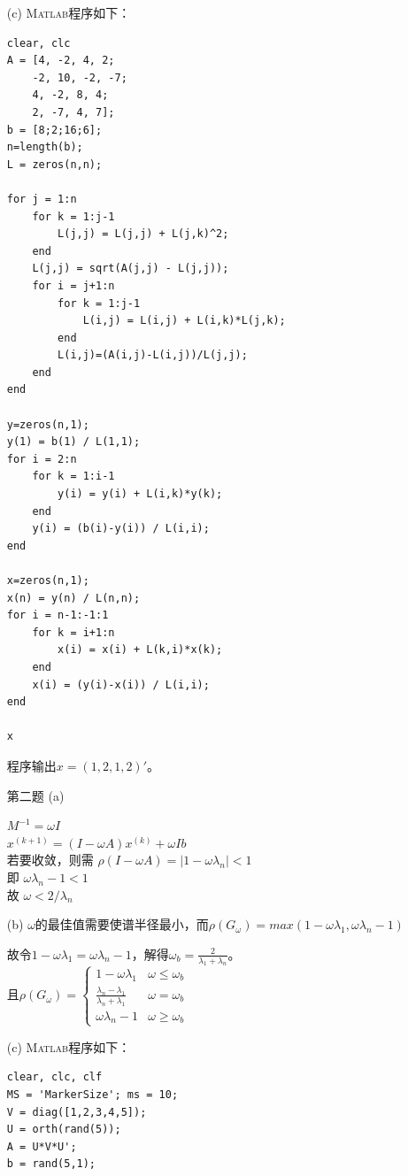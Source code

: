 \documentclass[12pt,a4paper,utf8]{ctexart}
\begin{document}
\begin{enumerate}
\text{~~~~\} }

\text{\} }

\subitem(c)
\textsc{Matlab}程序如下：
\begin{lstlisting}[frame=single]
clear, clc
A = [4, -2, 4, 2;
    -2, 10, -2, -7;
    4, -2, 8, 4;
    2, -7, 4, 7];
b = [8;2;16;6];
n=length(b);
L = zeros(n,n);

for j = 1:n
    for k = 1:j-1
        L(j,j) = L(j,j) + L(j,k)^2;
    end
    L(j,j) = sqrt(A(j,j) - L(j,j));
    for i = j+1:n
        for k = 1:j-1
            L(i,j) = L(i,j) + L(i,k)*L(j,k);
        end
        L(i,j)=(A(i,j)-L(i,j))/L(j,j);
    end
end

y=zeros(n,1);
y(1) = b(1) / L(1,1);
for i = 2:n
    for k = 1:i-1
        y(i) = y(i) + L(i,k)*y(k);
    end
    y(i) = (b(i)-y(i)) / L(i,i);
end

x=zeros(n,1);
x(n) = y(n) / L(n,n);
for i = n-1:-1:1
    for k = i+1:n
        x(i) = x(i) + L(k,i)*x(k);
    end
    x(i) = (y(i)-x(i)) / L(i,i);
end

x
\end{lstlisting}

程序输出$x=(1,2,1,2)'$。


\item[第二题]
\subitem(a)

$M^{-1}=\omega I$ \\
$x^{(k+1)}=(I-\omega A)x^{(k)} + \omega Ib$ \\
若要收敛，则需
$\rho(I-\omega A)=|1-\omega \lambda_n| < 1$ \\
即
$\omega \lambda_n - 1 < 1$ \\
故
$\omega < 2/\lambda_n$

\subitem(b)
$\omega$的最佳值需要使谱半径最小，而$\rho(G_\omega) = max(1-\omega \lambda_1, \omega\lambda_n-1)$

故令$1-\omega \lambda_1 = \omega\lambda_n-1$，解得$\omega_b=\frac{2}{\lambda_1+\lambda_n}$。\\
且$\rho(G_\omega)=\left\{\begin{array}{ll}
1-\omega\lambda_1 & \omega \leq \omega_b \\
\frac{\lambda_n-\lambda_1}{\lambda_n+\lambda_1} & \omega=\omega_b \\
\omega\lambda_n-1 & \omega\geq\omega_b
\end{array}\right.$

\subitem(c)
\textsc{Matlab}程序如下：
\begin{lstlisting}[frame=single]
clear, clc, clf
MS = 'MarkerSize'; ms = 10;
V = diag([1,2,3,4,5]);
U = orth(rand(5));
A = U*V*U';
b = rand(5,1);


\end{lstlisting}
\end{enumerate}
\end{document}
